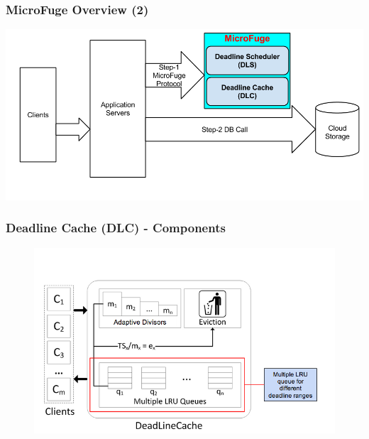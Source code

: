 \documentclass{beamer}
\begin{document}
\begin{frame}
  \frametitle{MicroFuge Overview (2)}
  \begin{center}
  \includegraphics[scale=0.33]{img/MF_FULL_NEW_2.png}
  \end{center}
\end{frame}

\begin{frame}
  \frametitle{Deadline Cache (DLC) - Components}
  \begin{figure}
    \begin{center}
      \centerline{\includegraphics[scale=0.45]{img/DLC_ARC_1.png}}
    \end{center}
  \end{figure}
\end{frame}
\end{document}
